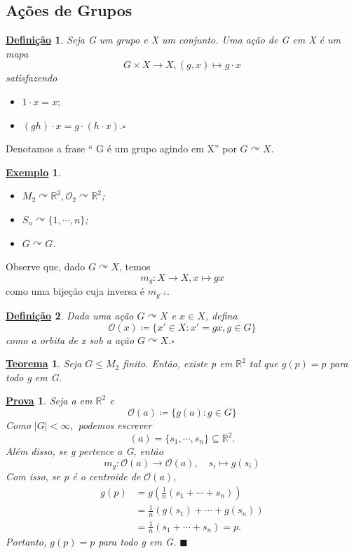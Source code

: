 \documentclass{article}
\newtheorem*{def*}{\underline{Defini\c c\~ao}}
\newtheorem*{theorem*}{\underline{Teorema}}
\newtheorem{example*}{\underline{Exemplo}}
\newtheorem*{proof*}{\underline{Prova}}
\renewcommand\qedsymbol{$\blacksquare$}
\begin{document}
\subsection{A\c cões de Grupos}
\begin{def*}
  Seja G um grupo e X um conjunto. Uma a\c cão de G em X é um mapa 
    \[
      G\times{X}\rightarrow X, (g,x)\mapsto g \cdot x
    \]
  satisfazendo 
 \begin{itemize}
   \item[i)] \(1 \cdot x = x;\)
   \item[ii)] \((gh)\cdot x= g \cdot (h \cdot x). \square\)
 \end{itemize}
\end{def*}
  Denotamos a frase `` G é um grupo agindo em X'' por \(G \curvearrowright X\).
  \begin{example*}
   \begin{itemize}
     \item[i)] \(M_{2} \curvearrowright \mathbb{R}^{2}, \mathcal{O}_{2} \curvearrowright \mathbb{R}^{2}\);
     \item[ii)] \(S_{n}\curvearrowright \{1, \cdots, n\}\);
     \item[iii)] \(G \curvearrowright G\).
   \end{itemize}
  \end{example*}
  Observe que, dado \(G \curvearrowright X\), temos 
    \[
      m_{g}:X\rightarrow X, x\mapsto gx
    \]
  como uma bije\c cão cuja inversa é \(m_{g^{-1}}\).
 \begin{def*}
   Dada uma a\c cão \(G \curvearrowright X\) e \(x\in X\), defina 
     \[
       \mathcal{O}(x)\coloneqq \{x'\in X: x'=gx, g\in G\}
     \]
     como a orbita de x sob a a\c cão \(G \curvearrowright X.\square\)
 \end{def*}
\hypertarget{fixed_pt}{
 \begin{theorem*}
   Seja \(G\leq M_{2}\) finito. Então, existe p em \(\mathbb{R}^{2}\) tal que
   \(g(p)=p\) para todo g em G.
 \end{theorem*}
}
\begin{proof*}
  Seja a em \(\mathbb{R}^{2}\) e 
    \[
      \mathcal{O}(a)\coloneqq \{g(a):g\in G\}
    \]
  Como \(|G| < \infty,\) podemos escrever 
    \[
      \mathcal{}(a) = \{s_{1},\cdots, s_{n}\}\subseteq{\mathbb{R}^{2}}.
    \]
  Além disso, se g pertence a G, então 
    \[
      m_{g}:\mathcal{O}(a)\rightarrow \mathcal{O}(a), \quad s_{i}\mapsto g(s_{i})
    \]
    Com isso, se p é o centroide de \(\mathcal{O}(a)\),
   \begin{align*}
     g(p) &= g(\frac{1}{n}(s_{1}+\cdots+s_{n}))\\
          &= \frac{1}{n}(g(s_{1})+\cdots+g(s_{n}))\\
          &= \frac{1}{n}(s_{1}+\cdots+s_{n}) = p.
   \end{align*}
   Portanto, \(g(p)=p\) para todo g em G. \qedsymbol
\end{proof*}
\newpage
\end{document}
